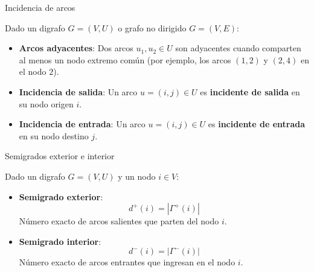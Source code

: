 \documentclass[
  ignorenonframetext,
]{beamer}
\providecommand{\tightlist}{%
  \setlength{\itemsep}{0pt}\setlength{\parskip}{0pt}}
\begin{document}
\begin{frame}{Incidencia de arcos}
\label{incidencia-de-arcos}
\begin{tcolorbox}[enhanced jigsaw, left=2mm, opacityback=0, titlerule=0mm, breakable, toptitle=1mm, rightrule=.15mm, bottomtitle=1mm, coltitle=black, title=\textcolor{quarto-callout-note-color}{\faInfo}\hspace{0.5em}{Definición: Incidencia de arcos}, colframe=quarto-callout-note-color-frame, colbacktitle=quarto-callout-note-color!10!white, arc=.35mm, toprule=.15mm, leftrule=.75mm, bottomrule=.15mm, opacitybacktitle=0.6, colback=white]

Dado un digrafo \(G = (V, U)\) o grafo no dirigido \(G = (V, E)\):

\begin{itemize}
\tightlist
\item
  \textbf{Arcos adyacentes}: Dos arcos \(u_1, u_2 \in U\) son adyacentes
  cuando comparten al menos un nodo extremo común (por ejemplo, los
  arcos \((1, 2)\) y \((2, 4)\) en el nodo \(2\)).
\item
  \textbf{Incidencia de salida}: Un arco \(u = (i, j) \in U\) es
  \textbf{incidente de salida} en su nodo origen \(i\).
\item
  \textbf{Incidencia de entrada}: Un arco \(u = (i, j) \in U\) es
  \textbf{incidente de entrada} en su nodo destino \(j\).
\end{itemize}

\end{tcolorbox}
\end{frame}

\begin{frame}{Semigrados exterior e interior}
\label{semigrados-exterior-e-interior}
\begin{tcolorbox}[enhanced jigsaw, left=2mm, opacityback=0, titlerule=0mm, breakable, toptitle=1mm, rightrule=.15mm, bottomtitle=1mm, coltitle=black, title=\textcolor{quarto-callout-note-color}{\faInfo}\hspace{0.5em}{Definición: Semigrados exterior e interior}, colframe=quarto-callout-note-color-frame, colbacktitle=quarto-callout-note-color!10!white, arc=.35mm, toprule=.15mm, leftrule=.75mm, bottomrule=.15mm, opacitybacktitle=0.6, colback=white]

Dado un digrafo \(G = (V, U)\) y un nodo \(i \in V\):

\begin{itemize}
\item
  \textbf{Semigrado exterior}: \[d^+(i) = |\Gamma^+(i)|\] Número exacto
  de arcos salientes que parten del nodo \(i\).
\item
  \textbf{Semigrado interior}: \[d^-(i) = |\Gamma^-(i)|\] Número exacto
  de arcos entrantes que ingresan en el nodo \(i\).
\end{itemize}

\end{tcolorbox}
\end{frame}
\end{document}
